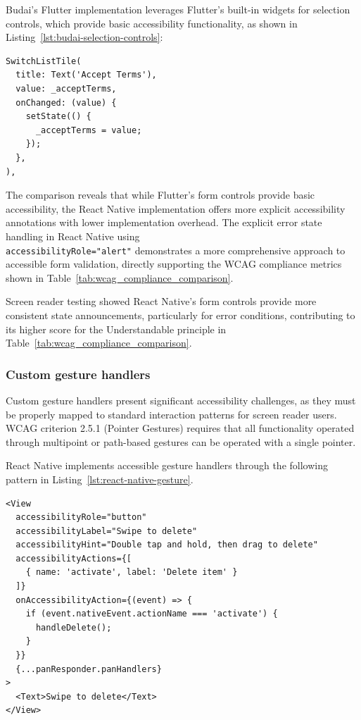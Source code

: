 Budai's Flutter implementation leverages Flutter's built-in widgets for selection controls, which provide basic accessibility functionality, as shown in Listing~\ref{lst:budai-selection-controls}:

\begin{lstlisting}[style=DartStyle, caption=Selection controls in Budai's Flutter code, label=lst:budai-selection-controls]
SwitchListTile(
  title: Text('Accept Terms'),
  value: _acceptTerms,
  onChanged: (value) {
    setState(() {
      _acceptTerms = value;
    });
  },
),
\end{lstlisting}

\pagebreak

The comparison reveals that while Flutter's form controls provide basic accessibility, the React Native implementation offers more explicit accessibility annotations with lower implementation overhead. The explicit error state handling in React Native using \\ \texttt{accessibilityRole="alert"} demonstrates a more comprehensive approach to accessible form validation, directly supporting the WCAG compliance metrics shown in Table~\ref{tab:wcag_compliance_comparison}.

Screen reader testing showed React Native's form controls provide more consistent state announcements, particularly for error conditions, contributing to its higher score for the Understandable principle in Table~\ref{tab:wcag_compliance_comparison}.

\subsubsection{Custom gesture handlers}
\label{subsubsec:gesture-handlers}

Custom gesture handlers present significant accessibility challenges, as they must be properly mapped to standard interaction patterns for screen reader users. WCAG criterion 2.5.1 (Pointer Gestures) requires that all functionality operated through multipoint or path-based gestures can be operated with a single pointer.

React Native implements accessible gesture handlers through the following pattern in Listing~\ref{lst:react-native-gesture}.

\begin{lstlisting}[style=ReactNativeStyle, caption=Accessible gesture handler in React Native, label=lst:react-native-gesture]
<View
  accessibilityRole="button"
  accessibilityLabel="Swipe to delete"
  accessibilityHint="Double tap and hold, then drag to delete"
  accessibilityActions={[
    { name: 'activate', label: 'Delete item' }
  ]}
  onAccessibilityAction={(event) => {
    if (event.nativeEvent.actionName === 'activate') {
      handleDelete();
    }
  }}
  {...panResponder.panHandlers}
>
  <Text>Swipe to delete</Text>
</View>
\end{lstlisting}

